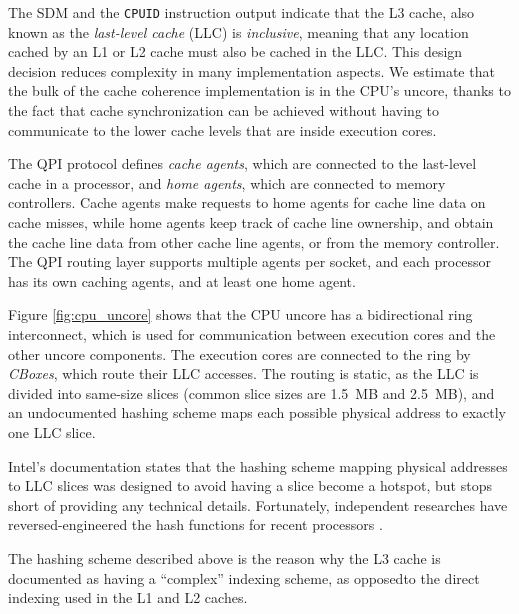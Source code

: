The SDM and the \texttt{CPUID} instruction output indicate that the L3 cache,
also known as the \textit{last-level cache} (LLC) is \textit{inclusive},
meaning that any location cached by an L1 or L2 cache must also be cached in
the LLC. This design decision reduces complexity in many implementation
aspects. We estimate that the bulk of the cache coherence implementation is in
the CPU's uncore, thanks to the fact that cache synchronization can be achieved
without having to communicate to the lower cache levels that are inside
execution cores.

The QPI protocol defines \textit{cache agents}, which are connected to the
last-level cache in a processor, and \textit{home agents}, which are connected
to memory controllers. Cache agents make requests to home agents for cache line
data on cache misses, while home agents keep track of cache line ownership, and
obtain the cache line data from other cache line agents, or from the memory
controller. The QPI routing layer supports multiple agents per socket, and each
processor has its own caching agents, and at least one home agent.


Figure \ref{fig:cpu_uncore} shows that the CPU uncore has a bidirectional ring
interconnect, which is used for communication between execution cores and the
other uncore components. The execution cores are connected to the ring by
\textit{CBoxes}, which route their LLC accesses. The routing is static, as the
LLC is divided into same-size slices (common slice sizes are 1.5~MB and
2.5~MB), and an undocumented hashing scheme maps each possible physical address
to exactly one LLC slice.

Intel's documentation states that the hashing scheme mapping physical addresses
to LLC slices was designed to avoid having a slice become a hotspot, but stops
short of providing any technical details. Fortunately, independent researches
have reversed-engineered the hash functions for recent processors
\cite{inci2015rsachannel, maurice2015intelhash, yarom2015intelhash}.

The hashing scheme described above is the reason why the L3 cache is documented
as having a ``complex'' indexing scheme, as opposedto the direct indexing used
in the L1 and L2 caches.

